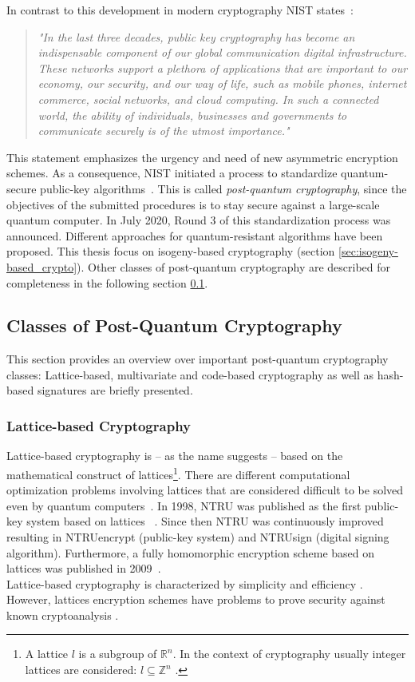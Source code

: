 In contrast to this development in modern cryptography \gls{NIST} states~\parencite{chen2016report}:
\begin{quote}
\textit{"In the last three decades, public key cryptography has become an indispensable component of our global communication digital infrastructure. These networks support a plethora of applications that are important to our economy, our security, and our way of life, such as mobile phones, internet commerce, social networks, and cloud computing. In such a connected world, the ability of individuals, businesses and governments to communicate securely is of the utmost importance."}
\end{quote}
This statement emphasizes the urgency and need of new asymmetric encryption schemes. As a consequence, \gls{NIST} initiated a process to standardize quantum-secure public-key algorithms~\parencite{nist2017callforproposals}. This is called \textit{post-quantum cryptography}, since the objectives of the submitted procedures is to stay secure against a large-scale quantum computer. In July 2020, Round 3 of this standardization process was announced. Different approaches for quantum-resistant algorithms have been proposed. This thesis focus on isogeny-based cryptography (section \ref{sec:isogeny-based_crypto}). Other classes of post-quantum cryptography are described for completeness in the following section \ref{sec:classes_pqc}.

\subsection{Classes of Post-Quantum Cryptography} \label{sec:classes_pqc}

This section provides an overview over important post-quantum cryptography classes: Lattice-based, multivariate and code-based cryptography as well as hash-based signatures are briefly presented. 
\subsubsection{Lattice-based Cryptography}
Lattice-based cryptography is -- as the name suggests -- based on the mathematical construct of lattices\footnote{A lattice $l$ is a subgroup of $\mathbb{R}^n$. In the context of cryptography usually integer lattices are considered: $l \subseteq \mathbb{Z}^n$ \parencite{chi2015lattice}.}. There are different computational optimization problems involving lattices that are considered difficult to be solved even by quantum computers~\parencite{chi2015lattice}. In 1998, \gls{NTRU} was published as the first public-key system based on lattices ~\parencite{hoffstein1998ntru}. Since then \gls{NTRU} was continuously improved resulting in NTRUencrypt (public-key system) and \gls{NTRUsign} (digital signing algorithm). Furthermore, a fully homomorphic encryption scheme based on lattices was published in 2009~\parencite{gentry2009fully}.\\
Lattice-based cryptography is characterized by simplicity and efficiency \parencite{chen2016report}. However, lattices encryption schemes have problems to prove security against known cryptoanalysis \parencite{chen2016report}.
